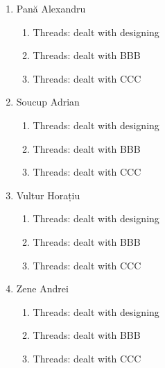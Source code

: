 \documentclass[a4paper,12pt]{report}
\begin{document}
\begin{enumerate}
	\item Pană Alexandru
	    \begin{enumerate}
	     \item Threads: dealt with designing
	     \item Threads: dealt with BBB
	     \item Threads: dealt with CCC
	    \end{enumerate}

	\item Soucup Adrian
	    \begin{enumerate}
	     \item Threads: dealt with designing
	     \item Threads: dealt with BBB
	     \item Threads: dealt with CCC
	    \end{enumerate}
	    
	\item Vultur Horațiu
	    \begin{enumerate}
	     \item Threads: dealt with designing
	     \item Threads: dealt with BBB
	     \item Threads: dealt with CCC
	    \end{enumerate}

	\item Zene Andrei
	    \begin{enumerate}
	     \item Threads: dealt with designing
	     \item Threads: dealt with BBB
	     \item Threads: dealt with CCC
	    \end{enumerate}
	   
\end{enumerate}







% 


% 
\end{document}
